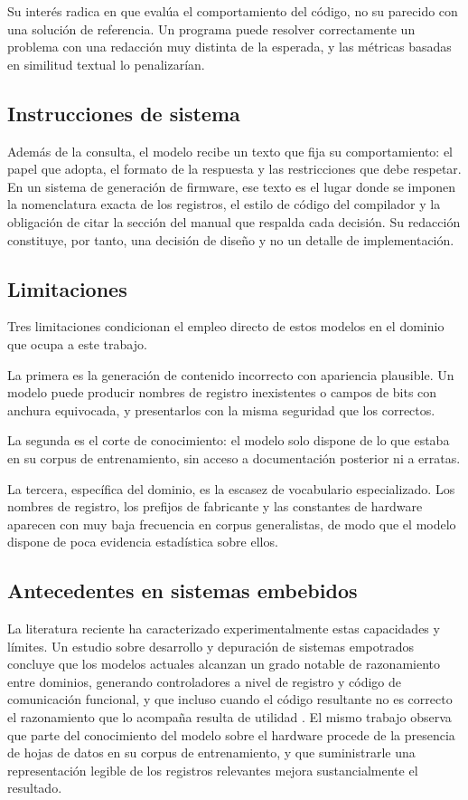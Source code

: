 Su interés radica en que evalúa el comportamiento del código, no su parecido con
una solución de referencia. Un programa puede resolver correctamente un problema
con una redacción muy distinta de la esperada, y las métricas basadas en
similitud textual lo penalizarían.

\subsection{Instrucciones de sistema}

Además de la consulta, el modelo recibe un texto que fija su comportamiento: el
papel que adopta, el formato de la respuesta y las restricciones que debe
respetar. En un sistema de generación de firmware, ese texto es el lugar donde
se imponen la nomenclatura exacta de los registros, el estilo de código del
compilador y la obligación de citar la sección del manual que respalda cada
decisión. Su redacción constituye, por tanto, una decisión de diseño y no un
detalle de implementación.

\subsection{Limitaciones}

Tres limitaciones condicionan el empleo directo de estos modelos en el dominio
que ocupa a este trabajo.

La primera es la generación de contenido incorrecto con apariencia plausible.
Un modelo puede producir nombres de registro inexistentes o campos de bits con
anchura equivocada, y presentarlos con la misma seguridad que los correctos.

La segunda es el corte de conocimiento: el modelo solo dispone de lo que estaba
en su corpus de entrenamiento, sin acceso a documentación posterior ni a
erratas.

La tercera, específica del dominio, es la escasez de vocabulario especializado.
Los nombres de registro, los prefijos de fabricante y las constantes de hardware
aparecen con muy baja frecuencia en corpus generalistas, de modo que el modelo
dispone de poca evidencia estadística sobre ellos.

\subsection{Antecedentes en sistemas embebidos}

La literatura reciente ha caracterizado experimentalmente estas capacidades y
límites. Un estudio sobre desarrollo y depuración de sistemas empotrados
concluye que los modelos actuales alcanzan un grado notable de razonamiento
entre dominios, generando controladores a nivel de registro y código de
comunicación funcional, y que incluso cuando el código resultante no es correcto
el razonamiento que lo acompaña resulta de utilidad \cite{englhardt2023embedded}.
El mismo trabajo observa que parte del conocimiento del modelo sobre el hardware
procede de la presencia de hojas de datos en su corpus de entrenamiento, y que
suministrarle una representación legible de los registros relevantes mejora
sustancialmente el resultado.

